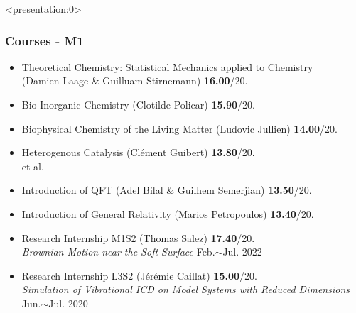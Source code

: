 \begin{frame}<presentation:0>
	\frametitle{Courses - M1}
	
	\begin{itemize}
		\setlength{\itemsep}{5pt}
	\item Theoretical Chemistry: Statistical Mechanics applied to Chemistry \\ (Damien Laage \& Guilluam Stirnemann) \hfill \textbf{16.00}/20.
	\item Bio-Inorganic Chemistry (Clotilde Policar) \hfill \textbf{15.90}/20.
	\item Biophysical Chemistry of the Living Matter (Ludovic Jullien) \hfill \textbf{14.00}/20.
	\item Heterogenous Catalysis (Clément Guibert) \hfill \textbf{13.80}/20. \\
	 \hfill et al.

	\item Introduction of QFT (Adel Bilal \& Guilhem Semerjian) \hfill \textbf{13.50}/20.
	\item Introduction of General Relativity (Marios Petropoulos) \hfill \textbf{13.40}/20.
	
	\bigskip

	\item Research Internship M1S2 (Thomas Salez) \hfill \textbf{17.40}/20. \\
	\textit{Brownian Motion near the Soft Surface} \hfill Feb.$\sim$Jul. 2022
	
	\item Research Internship L3S2 (Jérémie Caillat) \hfill \textbf{15.00}/20. \\
	\textit{Simulation of Vibrational ICD on Model Systems with Reduced Dimensions} \\ \hfill Jun.$\sim$Jul. 2020
	\end{itemize}
\end{frame}





